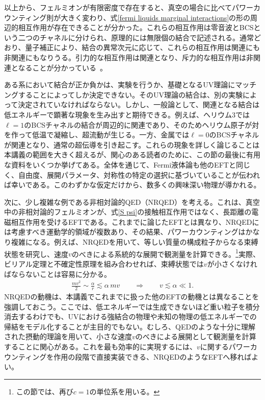 以上から、フェルミオンが有限密度で存在すると、真空の場合に比べてパワーカウンティング則が大きく変わり、式\eqref{fermi liquids marginal interactions}の形の周辺的相互作用が存在できることが分かった。これらの相互作用は零音波とBCSという二つのチャネルに分けられ、原理的には無限個の結合で記述される。通常どおり、量子補正により、結合の異常次元に応じて、これらの相互作用は関連にも非関連にもなりうる。引力的な相互作用は関連となり、斥力的な相互作用は非関連となることが分かっている~\cite{Shankar:1993pf}。

ある系において結合が正か負かは、実験を行うか、基礎となるUV理論にマッチングすることによってしか決定できない。そのUV理論の結合は、別の実験によって決定されていなければならない。しかし、一般論として、関連となる結合は低エネルギーで顕著な現象を生み出すと期待できる。例えば、ヘリウム3では$\ell =1$のBCSチャネルの結合が周辺的に関連であり、そのためヘリウム原子が対を作って低温で凝縮し、超流動が生じる。一方、金属では$\ell =0$のBCSチャネルが関連となり、通常の超伝導を引き起こす。これらの現象を詳しく論じることは本講義の範囲を大きく超えるが、関心のある読者のために、この節の最後に有用な資料をいくつか挙げてある。全体を通じて、Fermi液体論も他のEFTと同じく、自由度、展開パラメータ、対称性の特定の選択に基づいていることが伝われば幸いである。このわずかな仮定だけから、数多くの興味深い物理が導かれる。






次に、少し複雑な例である非相対論的QED（NRQED）を考える。これは、真空中の非相対論的フェルミオンが、式\eqref{S psi}の接触相互作用ではなく、長距離の電磁相互作用を受けるEFTである。これまでに論じたEFTとは異なり、NRQEDには考慮すべき運動学的領域が複数あり、その結果、パワーカウンティングはかなり複雑になる。例えば、NRQEDを用いて、等しい質量の構成粒子からなる束縛状態を研究し、速度$v$のべきによる系統的な展開で観測量を計算できる。\footnote{この節では、再び$c=1$の単位系を用いる。}実際、ビリアル定理と不確定性原理を組み合わせれば、束縛状態では$v$が小さくなければならないことは容易に分かる。
%
\begin{align}
	\frac{m v^2}{2} \sim \frac{\alpha}{r} \lesssim \alpha \, m v \qquad \Longrightarrow \qquad v \lesssim \alpha \ll 1. 
\end{align}
% 
NRQEDの動機は、本講義でこれまでに扱った他のEFTの動機とは異なることを強調しておこう。ここでは、低エネルギーでは生成できないほど重い粒子を積分消去するわけでも、UVにおける強結合の物理や未知の物理の低エネルギーでの帰結をモデル化することが主目的でもない。むしろ、QEDのような十分に理解された摂動的理論を用いて、小さな速度$v$のべきによる展開として観測量を計算することに関心がある。これを最も効率的に実現するには、$v$に関するパワーカウンティングを作用の段階で直接実装できる、NRQEDのようなEFTへ移ればよい。

